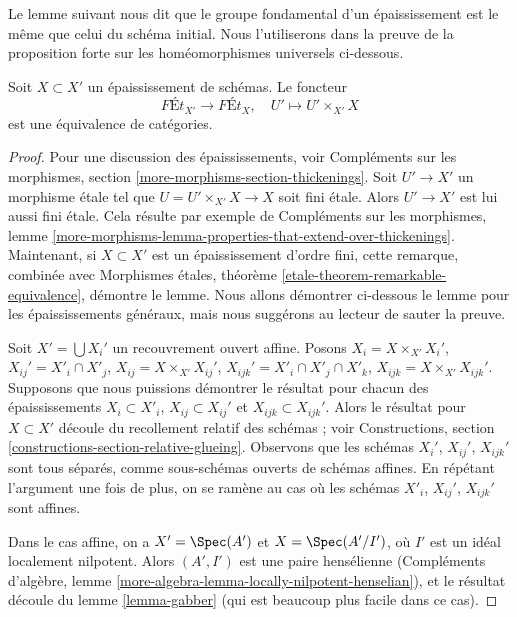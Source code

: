 \noindent
Le lemme suivant nous dit que le groupe fondamental d'un épaississement
est le même que celui du schéma initial. Nous l'utiliserons
dans la preuve de la proposition forte sur les homéomorphismes universels
ci-dessous.

\begin{lemma}
\label{lemma-thickening}
Soit $X \subset X'$ un épaississement de schémas. Le foncteur
$$
\textit{F\'Et}_{X'} \longrightarrow \textit{F\'Et}_X,\quad
U' \longmapsto U' \times_{X'} X
$$
est une équivalence de catégories.
\end{lemma}

\begin{proof}
Pour une discussion des épaississements, voir
Compléments sur les morphismes, section \ref{more-morphisms-section-thickenings}.
Soit $U' \to X'$ un morphisme étale tel que $U = U' \times_{X'} X \to X$
soit fini étale. Alors $U' \to X'$ est lui aussi fini étale.
Cela résulte par exemple de Compléments sur les morphismes, lemme
\ref{more-morphisms-lemma-properties-that-extend-over-thickenings}.
Maintenant, si $X \subset X'$ est un épaississement d'ordre fini, cette remarque,
combinée avec Morphismes étales, théorème
\ref{etale-theorem-remarkable-equivalence},
démontre le lemme. Nous allons démontrer ci-dessous le lemme pour les épaississements
généraux, mais nous suggérons au lecteur de sauter la preuve.

\medskip\noindent
Soit $X' = \bigcup X_i'$ un recouvrement ouvert affine. Posons
$X_i = X \times_{X'} X_i'$, $X_{ij}' = X'_i \cap X'_j$,
$X_{ij} = X \times_{X'} X_{ij}'$, $X_{ijk}' = X'_i \cap X'_j \cap X'_k$,
$X_{ijk} = X \times_{X'} X_{ijk}'$.
Supposons que nous puissions démontrer
le résultat pour chacun des épaississements
$X_i \subset X'_i$, $X_{ij} \subset X_{ij}'$ et $X_{ijk} \subset X_{ijk}'$.
Alors le résultat pour $X \subset X'$ découle du recollement relatif des
schémas ; voir
Constructions, section \ref{constructions-section-relative-glueing}.
Observons que les schémas $X_i'$, $X_{ij}'$, $X_{ijk}'$ sont
tous séparés, comme sous-schémas ouverts de schémas affines. En répétant
l'argument une fois de plus, on se ramène au cas où les schémas
$X'_i$, $X_{ij}'$, $X_{ijk}'$ sont affines.

\medskip\noindent
Dans le cas affine, on a $X' = \Spec(A')$ et $X = \Spec(A'/I')$,
où $I'$ est un idéal localement nilpotent. Alors $(A', I')$ est une
paire hensélienne (Compléments d'algèbre, lemme
\ref{more-algebra-lemma-locally-nilpotent-henselian}),
et le résultat découle du lemme \ref{lemma-gabber} (qui est
beaucoup plus facile dans ce cas).
\end{proof}

